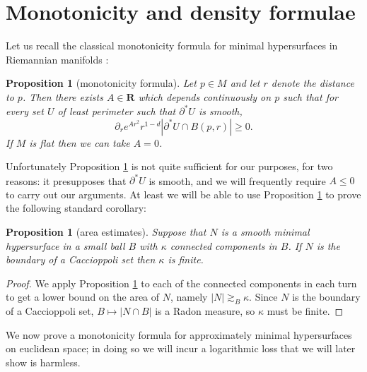 \documentclass[reqno,12pt,letterpaper]{amsart}
\newcommand{\RR}{\mathbf{R}}
\newtheorem{proposition}[theorem]{Proposition}
\theoremstyle{definition}
\numberwithin{equation}{section}
\begin{document}
\section{Monotonicity and density formulae}\label{inequalities}
Let us recall the classical monotonicity formula for minimal hypersurfaces in Riemannian manifolds \cite[\S7]{MarquesXX}:

\begin{proposition}[monotonicity formula]\label{monotonicity formula}
Let $p \in M$ and let $r$ denote the distance to $p$.
Then there exists $A \in \RR$ which depends continuously on $p$ such that for every set $U$ of least perimeter such that $\partial^* U$ is smooth,
$$\partial_r e^{Ar^2}r^{1 - d} |\partial^* U \cap B(p, r)| \geq 0.$$
If $M$ is flat then we can take $A = 0$.
\end{proposition}

Unfortunately Proposition \ref{monotonicity formula} is not quite sufficient for our purposes, for two reasons: it presupposes that $\partial^* U$ is smooth, and we will frequently require $A \leq 0$ to carry out our arguments.
At least we will be able to use Proposition \ref{monotonicity formula} to prove the following standard corollary:

\begin{proposition}[area estimates]\label{area estimates}
Suppose that $N$ is a smooth minimal hypersurface in a small ball $B$ with $\kappa$ connected components in $B$.
If $N$ is the boundary of a Caccioppoli set then $\kappa$ is finite.
\end{proposition}
\begin{proof}
We apply Proposition \ref{monotonicity formula} to each of the connected components in each turn to get a lower bound on the area of $N$, namely $|N| \gtrsim_B \kappa$.
Since $N$ is the boundary of a Caccioppoli set, $B \mapsto |N \cap B|$ is a Radon measure, so $\kappa$ must be finite.
\end{proof}

We now prove a monotonicity formula for approximately minimal hypersurfaces on euclidean space; in doing so we will incur a logarithmic loss that we will later show is harmless.
\end{document}
